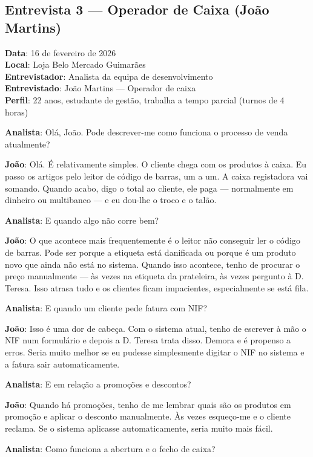 \documentclass[a4paper,12pt]{scrreprt}
\begin{document}
\subsection*{Entrevista 3 --- Operador de Caixa (João Martins)}
\textbf{Data}: 16 de fevereiro de 2026\\
\textbf{Local}: Loja Belo Mercado Guimarães\\
\textbf{Entrevistador}: Analista da equipa de desenvolvimento\\
\textbf{Entrevistado}: João Martins --- Operador de caixa\\
\textbf{Perfil}: 22 anos, estudante de gestão, trabalha a tempo parcial (turnos de 4 horas)

\textbf{Analista}: Olá, João. Pode descrever-me como funciona o processo de venda atualmente?

\textbf{João}: Olá. É relativamente simples. O cliente chega com os produtos à caixa. Eu passo os artigos pelo leitor de código de barras, um a um. A caixa registadora vai somando. Quando acabo, digo o total ao cliente, ele paga --- normalmente em dinheiro ou multibanco --- e eu dou-lhe o troco e o talão.

\textbf{Analista}: E quando algo não corre bem?

\textbf{João}: O que acontece mais frequentemente é o leitor não conseguir ler o código de barras. Pode ser porque a etiqueta está danificada ou porque é um produto novo que ainda não está no sistema. Quando isso acontece, tenho de procurar o preço manualmente --- às vezes na etiqueta da prateleira, às vezes pergunto à D. Teresa. Isso atrasa tudo e os clientes ficam impacientes, especialmente se está fila.

\textbf{Analista}: E quando um cliente pede fatura com NIF?

\textbf{João}: Isso é uma dor de cabeça. Com o sistema atual, tenho de escrever à mão o NIF num formulário e depois a D. Teresa trata disso. Demora e é propenso a erros. Seria muito melhor se eu pudesse simplesmente digitar o NIF no sistema e a fatura sair automaticamente.

\textbf{Analista}: E em relação a promoções e descontos?

\textbf{João}: Quando há promoções, tenho de me lembrar quais são os produtos em promoção e aplicar o desconto manualmente. Às vezes esqueço-me e o cliente reclama. Se o sistema aplicasse automaticamente, seria muito mais fácil.

\textbf{Analista}: Como funciona a abertura e o fecho de caixa?
\end{document}
